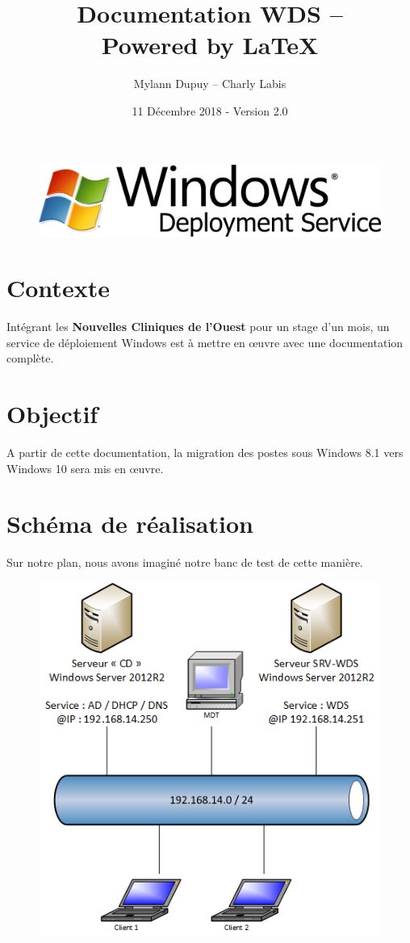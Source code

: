 \documentclass[11pt,a4paper,oneside]{article}
\author{Mylann Dupuy -- Charly Labis}
\title{Documentation WDS --  \\ Powered by \LaTeX}
\date{11 Décembre 2018 - Version 2.0}
\begin{document}
\maketitle
\begin{figure}[hbtp]
\centering
\includegraphics[scale=1]{Pictures/bannierewds.png}
\end{figure}
\newpage

\tableofcontents
\newpage
\setcounter{page}{3}
\newpage

\section{Contexte}
Intégrant les \textbf{Nouvelles Cliniques de l'Ouest} pour un stage d'un mois, un service de déploiement Windows est à mettre en \oe{}uvre avec une documentation complète.

\section{Objectif}
A partir de cette documentation, la migration des postes sous Windows 8.1 vers Windows 10 sera mis en \oe{}uvre.

\section{Schéma de réalisation}
Sur notre plan, nous avons imaginé notre banc de test de cette manière. \\ 
\begin{figure}[hbtp]
\centering
\includegraphics[scale=1.2]{Pictures/Plan.png}
\end{figure}
\newpage
\end{document}
